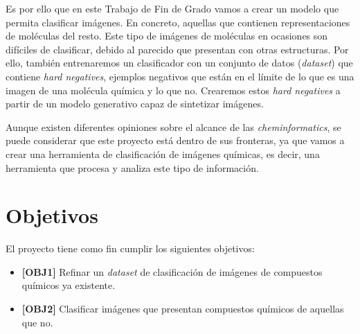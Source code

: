 Es por ello que en este Trabajo de Fin de Grado vamos a crear un modelo que permita clasificar imágenes. En concreto, aquellas que contienen representaciones de moléculas del resto. Este tipo de imágenes de moléculas en ocasiones son difíciles de clasificar, debido al parecido que presentan con otras estructuras. Por ello, también entrenaremos un clasificador con un conjunto de datos (\textit{dataset}) que contiene \textit{hard negatives}, ejemplos negativos que están en el límite de lo que es una imagen de una molécula química y lo que no. Crearemos estos \textit{hard negatives} a partir de un modelo generativo capaz de sintetizar imágenes.


Aunque existen diferentes opiniones sobre el alcance de las \textit{cheminformatics}, se puede considerar que este proyecto está dentro de sus fronteras, ya que vamos a crear una herramienta de clasificación de imágenes químicas, es decir, una herramienta que procesa y analiza este tipo de información.

\section{Objetivos}
El proyecto tiene como fin cumplir los siguientes objetivos:

\begin{itemize} \label{objetivos}
    \item \textbf{[OBJ1]} Refinar un \textit{dataset} de clasificación de imágenes de compuestos químicos ya existente.
    \item \textbf{[OBJ2]} Clasificar imágenes que presentan compuestos químicos de aquellas que no.
\end{itemize}